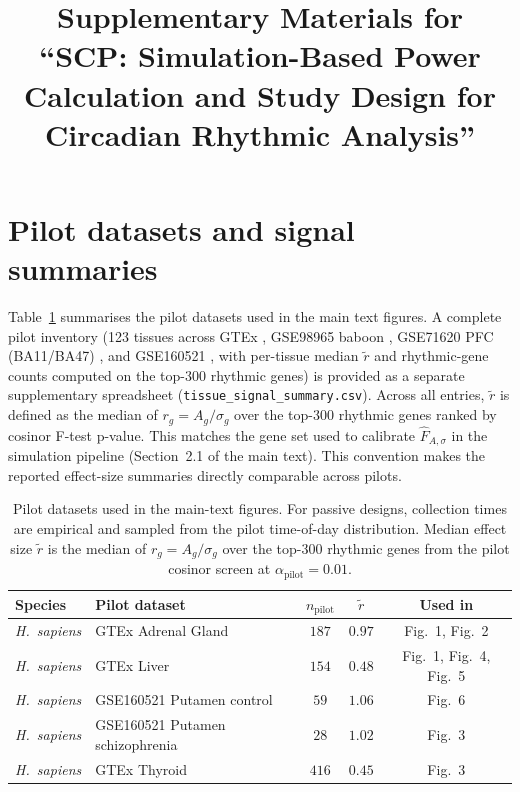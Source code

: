 \documentclass{article}
\title{Supplementary Materials for\\
``\textsc{SCP}: Simulation-Based Power Calculation and Study Design for Circadian Rhythmic Analysis''}
\author{}
\date{}
\begin{document}
\maketitle


\section{Pilot datasets and signal summaries}
\label{sec:pilot_summary}

Table~\ref{tab:pilot_summary} summarises the pilot datasets used in
the main text figures. A complete pilot inventory (123 tissues across GTEx \citep{gtex2020atlas}, GSE98965 baboon \citep{Mure2018baboon}, GSE71620 PFC (BA11/BA47)
\citep{chen2016aging}, and GSE160521 \citep{ketchesin2021diurnal}, with
per-tissue median $\tilde r$ and rhythmic-gene counts computed on the
top-$300$ rhythmic genes) is provided as a separate supplementary
spreadsheet (\texttt{tissue\_signal\_summary.csv}). Across all entries,
$\tilde r$ is defined as the median of $r_g = A_g / \sigma_g$ over the
top-$300$ rhythmic genes ranked by cosinor F-test p-value. This matches
the gene set used to calibrate $\hat{F}_{A,\sigma}$ in the simulation
pipeline (Section~2.1 of the main text). This convention makes the
reported effect-size summaries directly comparable across pilots.

\begin{table}[!htbp]
\centering
\small
\caption{Pilot datasets used in the main-text figures. For passive
designs, collection times are empirical and sampled from the pilot
time-of-day distribution. Median effect size $\tilde r$ is the median
of $r_g = A_g/\sigma_g$ over the top-$300$ rhythmic genes from the
pilot cosinor screen at $\alpha_{\mathrm{pilot}} = 0.01$.}
\label{tab:pilot_summary}
\begin{tabular}{llccc}
\toprule
Species & Pilot dataset & $n_{\mathrm{pilot}}$ & $\tilde r$ & Used in \\
\midrule
\textit{H.\ sapiens} & GTEx Adrenal Gland & $187$ & $0.97$ & Fig.~1, Fig.~2 \\
\textit{H.\ sapiens} & GTEx Liver & $154$ & $0.48$ & Fig.~1, Fig.~4, Fig.~5 \\
\textit{H.\ sapiens} & GSE160521 Putamen control & $59$ & $1.06$ & Fig.~6 \\
\textit{H.\ sapiens} & GSE160521 Putamen schizophrenia  & $28$ & $1.02$ & Fig.~3 \\
\textit{H.\ sapiens} & GTEx Thyroid & $416$ & $0.45$ & Fig.~3 \\
\bottomrule
\end{tabular}
\end{table}
\end{document}
